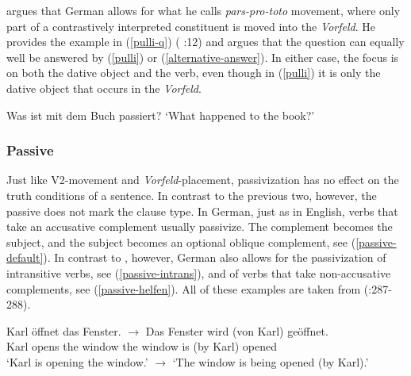 \documentclass[output=paper]{langsci/langscibook}
\begin{document}
\cite{Fanselow:04} argues that  German allows for what he calls  \textit{pars-pro-toto} movement, where only part of a contrastively interpreted constituent is moved into the \textit{Vorfeld}. He provides the example in (\ref{pulli-q}) (\citeauthor{Fanselow:04} \citeyear{Fanselow:04}:12) and argues that the question can equally well be answered by (\ref{pulli}) or (\ref{alternative-answer}). In either case, the focus is on both the dative object and the verb, even though in (\ref{pulli}) it is only the dative object that occurs in the \textit{Vorfeld}.

\begin{exe}
\ex Was ist mit dem Buch passiert? \quad `What happened to the book?' \label{pulli-q}
\begin{xlist}
\end{xlist}
\end{exe}



\subsubsection{Passive}

Just like V2-movement and \textit{Vorfeld}-placement, passivization has no effect on the truth conditions of a sentence. In contrast to the previous two, however, the passive does not mark the clause type. In German, just as in English, verbs that take an accusative complement usually passivize. The complement becomes the subject, and the subject becomes an optional oblique complement, see (\ref{passive-default}). In contrast to , however,  German also allows for the passivization of intransitive verbs, see (\ref{passive-intrans}), and of verbs that take non-accusative complements, see (\ref{passive-helfen}). All of these examples are taken from \citeauthor{Mueller:13} (\citeyear{Mueller:13}:287-288).

\ea
\gll Karl \"offnet das Fenster. $\longrightarrow$ Das Fenster wird (von Karl) ge\"offnet.\\
Karl opens the window {} the window is (by Karl) opened\\
\glt `Karl is opening the window.' $\longrightarrow$ `The window is being opened (by Karl).' \label{passive-default}
\z
\end{document}
